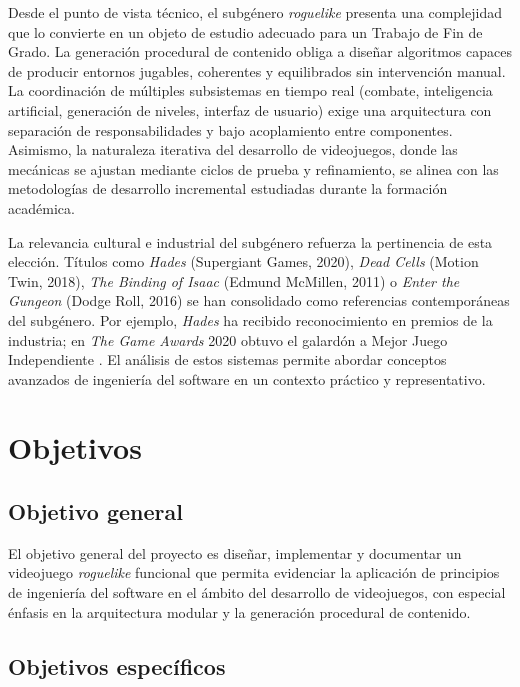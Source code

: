 Desde el punto de vista técnico, el subgénero \textit{roguelike} presenta una complejidad que lo convierte en un objeto de estudio adecuado para un Trabajo de Fin de Grado. La generación procedural de contenido obliga a diseñar algoritmos capaces de producir entornos jugables, coherentes y equilibrados sin intervención manual. La coordinación de múltiples subsistemas en tiempo real (combate, inteligencia artificial, generación de niveles, interfaz de usuario) exige una arquitectura con separación de responsabilidades y bajo acoplamiento entre componentes. Asimismo, la naturaleza iterativa del desarrollo de videojuegos, donde las mecánicas se ajustan mediante ciclos de prueba y refinamiento, se alinea con las metodologías de desarrollo incremental estudiadas durante la formación académica.

La relevancia cultural e industrial del subgénero refuerza la pertinencia de esta elección. Títulos como \textit{Hades} (Supergiant Games, 2020), \textit{Dead Cells} (Motion Twin, 2018), \textit{The Binding of Isaac} (Edmund McMillen, 2011) o \textit{Enter the Gungeon} (Dodge Roll, 2016) se han consolidado como referencias contemporáneas del subgénero. Por ejemplo, \textit{Hades} ha recibido reconocimiento en premios de la industria; en \textit{The Game Awards} 2020 obtuvo el galardón a Mejor Juego Independiente \cite{CNET_GAME_AWARDS_2020_WINNERS}. El análisis de estos sistemas permite abordar conceptos avanzados de ingeniería del software en un contexto práctico y representativo.

\section{Objetivos}


\subsection{Objetivo general}


El objetivo general del proyecto es diseñar, implementar y documentar un videojuego \textit{roguelike} funcional que permita evidenciar la aplicación de principios de ingeniería del software en el ámbito del desarrollo de videojuegos, con especial énfasis en la arquitectura modular y la generación procedural de contenido.

\subsection{Objetivos específicos}


